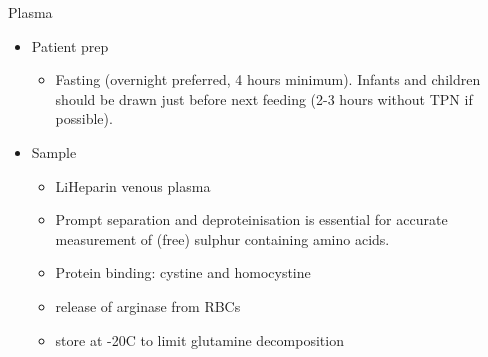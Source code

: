 \documentclass[presentation, smaller]{beamer}
\begin{document}
\begin{frame}[label={sec:orgheadline5}]{Plasma}
\begin{itemize}
\item Patient prep
\begin{itemize}
\item Fasting (overnight preferred, 4 hours minimum). Infants and children should be
drawn just before next feeding (2-3 hours without TPN if possible).
\end{itemize}
\item Sample
\begin{itemize}
\item LiHeparin venous plasma
\item Prompt separation and deproteinisation is essential for accurate measurement of (free) sulphur containing amino acids.
\item Protein binding: cystine and homocystine
\item release of arginase from RBCs
\item store at -20\degree{}C to limit glutamine decomposition
\end{itemize}
\end{itemize}
\end{frame}
\end{document}

